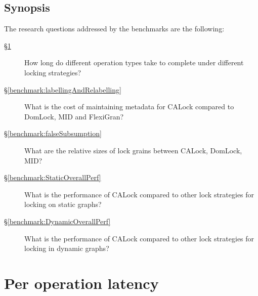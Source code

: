 
	\subsection{Synopsis}

	The research questions addressed by the benchmarks are the following:

	\begin{description}
		\item[\S \ref{benchmark:PerOpLatency}] How long do different operation types take to complete under different locking strategies?
		\item[\S \ref{benchmark:labellingAndRelabelling}] What is the cost of maintaining metadata for CALock compared to DomLock, MID and FlexiGran?
		\item[\S \ref{benchmark:falseSubsumption}] What are the relative sizes of lock grains between CALock, DomLock, MID?
		\item[\S \ref{benchmark:StaticOverallPerf}] What is the performance of CALock compared to other lock strategies for locking on static graphs?
		\item[\S \ref{benchmark:DynamicOverallPerf}] What is the performance of CALock compared to other lock strategies for locking in dynamic graphs?
	\end{description}
	
	
\section{Per operation latency} \label{benchmark:PerOpLatency}

